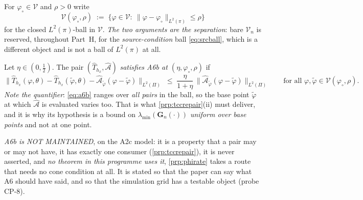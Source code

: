 \begin{definition}\label{def:a6b}
For $\varphi_\circ\in\mathcal V$ and $\rho>0$ write
\begin{equation}\label{eq:ball}
\mathcal V(\varphi_\circ,\rho)\;:=\;\big\{\varphi\in\mathcal V:\ \|\varphi-\varphi_\circ\|_{L^{2}(\pi)}\le\rho\big\}
\end{equation}
for the closed $L^{2}(\pi)$-ball in $\mathcal V$. \emph{The two arguments are the separation}: bare
$\mathcal V_n$ is reserved, throughout Part~H, for the \emph{source-condition} ball \eqref{eq:srcball},
which is a different object and is not a ball of $L^{2}(\pi)$ at all.

Let $\eta\in(0,\tfrac12)$. The pair $(\hat T_{h_x},\hat{\mathcal A})$ \emph{satisfies A6b at
$(\eta,\varphi_\circ,\rho)$} if
\begin{equation}\label{eq:a6b}
\big\|\hat T_{h_x}(\varphi,\theta)-\hat T_{h_x}(\tilde\varphi,\theta)-\hat{\mathcal A}_{\tilde\varphi}(\varphi-\tilde\varphi)\big\|_{L^{2}(\Pi)}
\;\le\;\frac{\eta}{1+\eta}\,\big\|\hat{\mathcal A}_{\tilde\varphi}(\varphi-\tilde\varphi)\big\|_{L^{2}(\Pi)}
\qquad\text{for all }\varphi,\tilde\varphi\in\mathcal V(\varphi_\circ,\rho) .
\end{equation}
\emph{Note the quantifier}: \eqref{eq:a6b} ranges over \emph{all pairs} in the ball, so the base point
$\tilde\varphi$ at which $\hat{\mathcal A}$ is evaluated varies too. That is what
\cref{prp:tccrepair}(ii) must deliver, and it is why its hypothesis is a bound on
$\lambda_{\min}(\mathbf G_n(\cdot))$ \emph{uniform over base points} and not at one point.

\emph{A6b is NOT MAINTAINED}, on the A2c model: it is a property that a pair may or may not have,
it has exactly one consumer (\cref{prp:tccrepair}), it is never asserted, and \emph{no theorem in this
programme uses it}, \cref{prp:phirate} takes a route that needs no cone condition at all. It is
stated so that the paper can say what A6 should have said, and so that the simulation grid has a
testable object (probe CP-8).
\end{definition}

